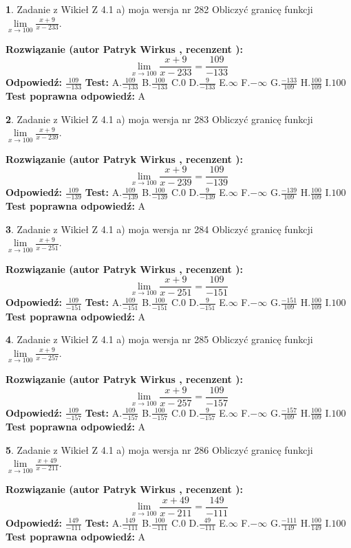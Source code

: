 \documentclass[12pt, a4paper]{article}
\theoremstyle{definition} %
\newtheorem{zad}{}
\newcommand{\zadStart}[1]{\begin{zad}#1\newline}
\newcommand{\zadStop}{\end{zad}}
\newcommand{\rozwStart}[2]{\noindent \textbf{Rozwiązanie (autor #1 , recenzent #2): }\newline}
\newcommand{\rozwStop}{\newline}
\newcommand{\odpStart}{\noindent \textbf{Odpowiedź:}\newline}
\newcommand{\odpStop}{\newline}
\newcommand{\testStart}{\noindent \textbf{Test:}\newline}
\newcommand{\testStop}{\newline}
\newcommand{\kluczStart}{\noindent \textbf{Test poprawna odpowiedź:}\newline}
\newcommand{\kluczStop}{\newline}
\begin{document}
\zadStart{Zadanie z Wikieł Z 4.1 a) moja wersja nr 282}
Obliczyć granicę funkcji $\lim\limits_{x\to100}\frac{x+9}{x-233}$.
\zadStop
\rozwStart{Patryk Wirkus}{}
$$\lim\limits_{x\to100}\frac{x+9}{x-233} = \frac{109}{-133}$$
\rozwStop
\odpStart
$\frac{109}{-133}$
\odpStop
\testStart
A.$\frac{109}{-133}$
B.$\frac{100}{-133}$
C.$0$
D.$\frac{9}{-133}$
E.$\infty$
F.$-\infty$
G.$\frac{-133}{109}$
H.$\frac{100}{109}$
I.$100$
\testStop
\kluczStart
A
\kluczStop



\zadStart{Zadanie z Wikieł Z 4.1 a) moja wersja nr 283}
Obliczyć granicę funkcji $\lim\limits_{x\to100}\frac{x+9}{x-239}$.
\zadStop
\rozwStart{Patryk Wirkus}{}
$$\lim\limits_{x\to100}\frac{x+9}{x-239} = \frac{109}{-139}$$
\rozwStop
\odpStart
$\frac{109}{-139}$
\odpStop
\testStart
A.$\frac{109}{-139}$
B.$\frac{100}{-139}$
C.$0$
D.$\frac{9}{-139}$
E.$\infty$
F.$-\infty$
G.$\frac{-139}{109}$
H.$\frac{100}{109}$
I.$100$
\testStop
\kluczStart
A
\kluczStop



\zadStart{Zadanie z Wikieł Z 4.1 a) moja wersja nr 284}
Obliczyć granicę funkcji $\lim\limits_{x\to100}\frac{x+9}{x-251}$.
\zadStop
\rozwStart{Patryk Wirkus}{}
$$\lim\limits_{x\to100}\frac{x+9}{x-251} = \frac{109}{-151}$$
\rozwStop
\odpStart
$\frac{109}{-151}$
\odpStop
\testStart
A.$\frac{109}{-151}$
B.$\frac{100}{-151}$
C.$0$
D.$\frac{9}{-151}$
E.$\infty$
F.$-\infty$
G.$\frac{-151}{109}$
H.$\frac{100}{109}$
I.$100$
\testStop
\kluczStart
A
\kluczStop



\zadStart{Zadanie z Wikieł Z 4.1 a) moja wersja nr 285}
Obliczyć granicę funkcji $\lim\limits_{x\to100}\frac{x+9}{x-257}$.
\zadStop
\rozwStart{Patryk Wirkus}{}
$$\lim\limits_{x\to100}\frac{x+9}{x-257} = \frac{109}{-157}$$
\rozwStop
\odpStart
$\frac{109}{-157}$
\odpStop
\testStart
A.$\frac{109}{-157}$
B.$\frac{100}{-157}$
C.$0$
D.$\frac{9}{-157}$
E.$\infty$
F.$-\infty$
G.$\frac{-157}{109}$
H.$\frac{100}{109}$
I.$100$
\testStop
\kluczStart
A
\kluczStop



\zadStart{Zadanie z Wikieł Z 4.1 a) moja wersja nr 286}
Obliczyć granicę funkcji $\lim\limits_{x\to100}\frac{x+49}{x-211}$.
\zadStop
\rozwStart{Patryk Wirkus}{}
$$\lim\limits_{x\to100}\frac{x+49}{x-211} = \frac{149}{-111}$$
\rozwStop
\odpStart
$\frac{149}{-111}$
\odpStop
\testStart
A.$\frac{149}{-111}$
B.$\frac{100}{-111}$
C.$0$
D.$\frac{49}{-111}$
E.$\infty$
F.$-\infty$
G.$\frac{-111}{149}$
H.$\frac{100}{149}$
I.$100$
\testStop
\kluczStart
A
\kluczStop
\end{document}
